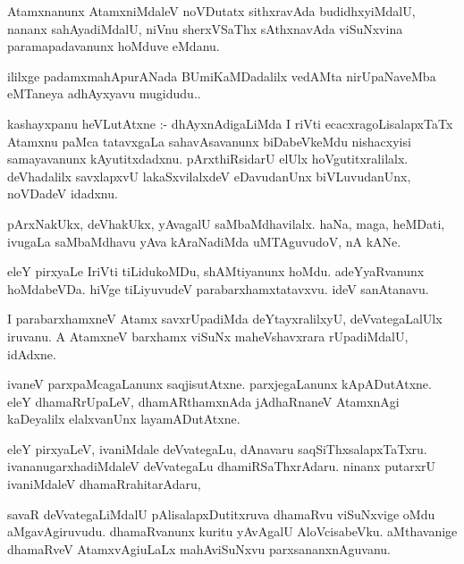 \documentclass{article}
\begin{document}
\begin{mn}
Atamxnanunx AtamxniMdaleV noVDutatx  sithxravAda budidhxyiMdalU, nananx 
sahAyadiMdalU, niVnu sherxVSaThx sAthxnavAda viSuNxvina paramapadavanunx 
hoMduve eMdanu.
\end{mn}

\begin{mn}
ililxge padamxmahApurANada BUmiKaMDadalilx vedAMta nirUpaNaveMba eMTaneya adhAyxyavu mugidudu..
\end{mn}


\begin{mn}
kashayxpanu heVLutAtxne :- dhAyxnAdigaLiMda I riVti ecacxragoLisalapxTaTx 
Atamxnu paMca tatavxgaLa sahavAsavanunx biDabeVkeMdu nishacxyisi samayavanunx
 kAyutitxdadxnu.  pArxthiRsidarU elUlx hoVgutitxralilalx. deVhadalilx 
 savxlapxvU lakaSxvilalxdeV eDavudanUnx  biVLuvudanUnx, noVDadeV idadxnu. 
\end{mn}

\begin{mn}
pArxNakUkx, deVhakUkx, yAvagalU saMbaMdhavilalx. haNa, maga, heMDati, 
ivugaLa saMbaMdhavu yAva kAraNadiMda uMTAguvudoV, nA kANe. 
\end{mn}

\begin{mn}
eleY pirxyaLe IriVti tiLidukoMDu, shAMtiyanunx hoMdu. adeYyaRvanunx hoMdabeVDa.
 hiVge tiLiyuvudeV parabarxhamxtatavxvu. ideV sanAtanavu.
\end{mn}

\begin{mn}
I parabarxhamxneV Atamx savxrUpadiMda deYtayxralilxyU, deVvategaLalUlx 
iruvanu. A AtamxneV barxhamx viSuNx maheVshavxrara rUpadiMdalU, idAdxne. 
\end{mn}

\begin{mn}
ivaneV parxpaMcagaLanunx saqjisutAtxne. parxjegaLanunx kApADutAtxne. 
eleY dhamaRrUpaLeV, dhamARthamxnAda jAdhaRnaneV AtamxnAgi kaDeyalilx 
elalxvanUnx  layamADutAtxne. 
\end{mn}

\begin{mn}
eleY pirxyaLeV, ivaniMdale deVvategaLu, dAnavaru saqSiThxsalapxTaTxru. 
ivananugarxhadiMdaleV deVvategaLu dhamiRSaThxrAdaru. ninanx putarxrU 
ivaniMdaleV dhamaRrahitarAdaru,
\end{mn}

\begin{mn}
savaR deVvategaLiMdalU pAlisalapxDutitxruva dhamaRvu viSuNxvige oMdu 
aMgavAgiruvudu. dhamaRvanunx  kuritu yAvAgalU AloVcisabeVku. aMthavanige 
dhamaRveV AtamxvAgiuLaLx mahAviSuNxvu parxsananxnAguvanu. 
\end{mn}
\end{document}
